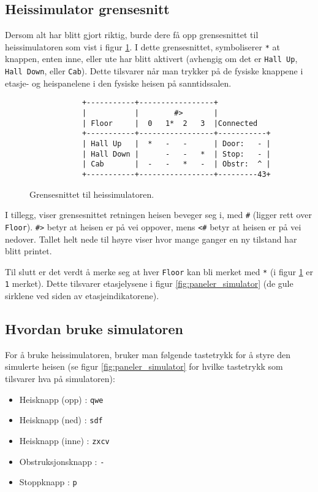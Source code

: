 \subsection{Heissimulator grensesnitt}

Dersom alt har blitt gjort riktig, burde dere få opp grensesnittet til heissimulatoren som vist i figur \ref{fig:ascii-box}. I dette grensesnittet, symboliserer \verb|*| at knappen, enten inne, eller ute har blitt aktivert (avhengig om det er \verb|Hall Up|, \verb|Hall Down|, eller \verb|Cab|). Dette tilsvarer når man trykker på de fysiske knappene i etasje- og heispanelene i den fysiske heisen på sanntidssalen.

\begin{figure}[ht]
\centering
\begin{verbatim}
            +-----------+-----------------+
            |           |        #>       |
            | Floor     |  0   1*  2   3  |Connected
            +-----------+-----------------+-----------+
            | Hall Up   |  *   -   -      | Door:   - |
            | Hall Down |      -   -   *  | Stop:   - |
            | Cab       |  -   -   *   -  | Obstr:  ^ |
            +-----------+-----------------+---------43+
\end{verbatim}
\caption{Grensesnittet til heissimulatoren.}
\label{fig:ascii-box}
\end{figure}

I tillegg, viser grensesnittet retningen heisen beveger seg i, med \verb|#| (ligger rett over \verb|Floor|). \verb|#>| betyr at heisen er på vei oppover, mens \verb|<#| betyr at heisen er på vei nedover. Tallet helt nede til høyre viser hvor mange ganger en ny tilstand har blitt printet.

Til slutt er det verdt å merke seg at hver \verb|Floor| kan bli merket med \verb|*| (i figur \ref{fig:ascii-box} er \verb|1| merket). Dette tilsvarer etasjelysene i figur \ref{fig:paneler_simulator} (de gule sirklene ved siden av etasjeindikatorene).



\subsection{Hvordan bruke simulatoren}
For å bruke heissimulatoren, bruker man følgende tastetrykk for å styre den simulerte heisen (se figur \ref{fig:paneler_simulator} for hvilke tastetrykk som tilsvarer hva på simulatoren):

\begin{itemize}
    \item Heisknapp (opp)   : \verb|qwe|
    \item Heisknapp (ned)   : \verb|sdf|
    \item Heisknapp (inne)  : \verb|zxcv|
    \item Obstruksjonsknapp : \verb|-|
    \item Stoppknapp        : \verb|p|
\end{itemize}


